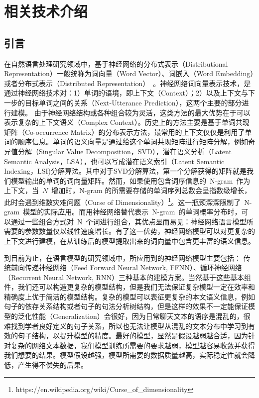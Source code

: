 \chapter{相关技术介绍}
\section{引言}
在自然语言处理研究领域中，基于神经网络的分布式表示（Distributional Representation）一般统称为词向量（Word Vector）、词嵌入（Word Embedding）或者分布式表示（Distributed Representation）~。神经网络词向量表示技术，是通过神经网络技术对：1）单词的语境，即上下文（Context）；2）以及上下文与下一步的目标单词之间的关系（Next-Utterance Prediction），这两个主要的部分进行建模。
由于神经网络结构或各种组合较为灵活，这类方法的最大优势在于可以表示复杂的上下文语义（Complex Context）。历史上的方法主要是基于单词共现矩阵（Co-occurrence Matrix）的分布表示方法，最常用的上下文仅仅是利用了单词的顺序信息。单词的语义向量是通过给这个单词共现矩阵进行矩阵分解，例如奇异值分解（Singular Value Decomposition，SVD），潜在语义分析（Latent Semantic Analysis，LSA），也可以写成潜在语义索引（Latent Semantic Indexing，LSI)分解算法。其中对于SVD分解算法，第一个分解获得的矩阵就是我们模型输出的单词的词向量矩阵。然而，如果使用包含词序信息的~N-gram~作为上下文，当~$N$~增加时，N-gram 的所需要存储的单词序列总数会呈指数级增长，此时会遇到维数灾难问题（Curse of Dimensionality）\footnote{https://en.wikipedia.org/wiki/Curse\_of\_dimensionality}。这一瓶颈深深限制了~N-gram~模型的实际应用。而用神经网络替代表示~N-gram~的单词概率分布时，可以通过一些组合方式对~N~个词进行组合，其优点显而易见：神经网络语言模型所需要的参数数量仅以线性速度增长。有了这一优势，神经网络模型可以对更复杂的上下文进行建模，在从训练后的模型提取出来的词向量中包含更丰富的语义信息。

到目前为止，在语言模型的研究领域中，所应用到的神经网络模型主要包括： 传统前向传递神经网络（Feed Forward Neural Network, FFNN）、循环神经网络（Recurrent Neural Network, RNN）三种基本的建模方案。当然基于这些基本组件，我们还可以构造更复杂的模型结构，但是我们无法保证复杂模型一定在效率和精确度上优于简洁的模型结构。复杂的模型可以表征更复杂的本文语义信息，例如句子的依存关系结构或者句子的句法分析树结构，但是这样的效果不一定能保证模型的泛化性能（Generalization）会很好，因为日常聊天文本的语序是混乱的，很难找到学者良好定义的句子关系，所以也无法让模型从混乱的文本分布中学习到有效的句子结构，以提升模型的精度。最好的模型，显然是假设越弱越合适，因为针对复杂的网络文本数据，我们模型训练所需要的要求越弱，模型越容易收敛并获得我们想要的结果。模型假设越强，模型所需要的数据质量越高，实际稳定性就会降低，产生得不偿失的后果。

